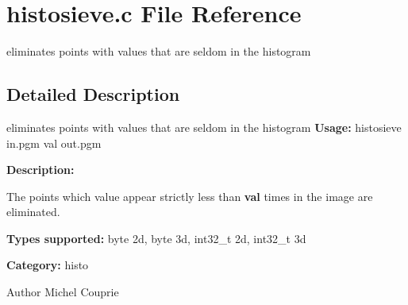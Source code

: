 \section{histosieve.c File Reference}
\label{histosieve_8c}


eliminates points with values that are seldom in the histogram  




\subsection{Detailed Description}
eliminates points with values that are seldom in the histogram {\bfseries Usage:} histosieve in.pgm val out.pgm

{\bfseries Description:}

The points which value appear strictly less than {\bfseries val} times in the image are eliminated.

{\bfseries Types supported:} byte 2d, byte 3d, int32\_\-t 2d, int32\_\-t 3d

{\bfseries Category:} histo

\begin{DoxyAuthor}{Author}
Michel Couprie 
\end{DoxyAuthor}
